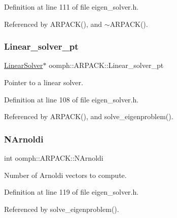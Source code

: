 Definition at line 111 of file eigen\+\_\+solver.\+h.



Referenced by A\+R\+P\+A\+C\+K(), and $\sim$\+A\+R\+P\+A\+C\+K().

\mbox{\label{classoomph_1_1ARPACK_a647a45676349ba86abd5d2ff9aff022d}} 
\subsubsection{\texorpdfstring{Linear\+\_\+solver\+\_\+pt}{Linear\_solver\_pt}}
{\footnotesize\ttfamily \hyperlink{classoomph_1_1LinearSolver}{Linear\+Solver}$\ast$ oomph\+::\+A\+R\+P\+A\+C\+K\+::\+Linear\+\_\+solver\+\_\+pt\hspace{0.3cm}{\ttfamily [private]}}



Pointer to a linear solver. 



Definition at line 108 of file eigen\+\_\+solver.\+h.



Referenced by A\+R\+P\+A\+C\+K(), and solve\+\_\+eigenproblem().

\mbox{\label{classoomph_1_1ARPACK_a2f430dc8c1a8d890a90a95bdd66e97cc}} 
\subsubsection{\texorpdfstring{N\+Arnoldi}{NArnoldi}}
{\footnotesize\ttfamily int oomph\+::\+A\+R\+P\+A\+C\+K\+::\+N\+Arnoldi\hspace{0.3cm}{\ttfamily [private]}}



Number of Arnoldi vectors to compute. 



Definition at line 119 of file eigen\+\_\+solver.\+h.



Referenced by solve\+\_\+eigenproblem().

